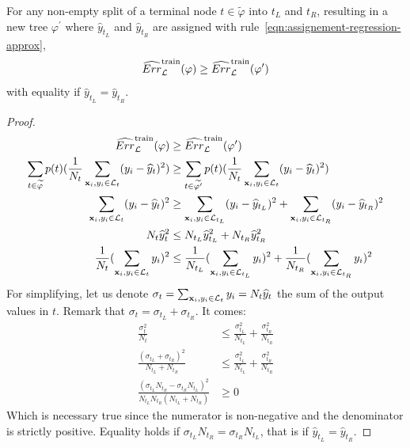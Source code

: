 \begin{proposition}\label{prop:any-split-reduce-regression}
For any non-empty split of a terminal node $t \in \widetilde{\varphi}$ into $t_L$ and
$t_R$, resulting in a new tree $\varphi^\prime$ where $\widehat{y}_{t_L}$ and $\widehat{y}_{t_R}$
are assigned with rule~\ref{eqn:assignement-regression-approx}, $$\widehat{Err}_{\cal
L}^\text{train}(\varphi) \geq \widehat{Err}_{\cal
L}^\text{train}(\varphi^\prime)$$ with equality if $\widehat{y}_{t_L} = \widehat{y}_{t_R}$.
\end{proposition}

\begin{proof}
\begin{align*}
\widehat{Err}_{\cal L}^\text{train}(\varphi) &\geq \widehat{Err}_{\cal L}^\text{train}(\varphi^\prime)  \\
\sum_{t \in \widetilde{\varphi}} p(t) (\frac{1}{N_t} \sum_{\mathbf{x}_i, y_i \in {\cal L}_t} (y_i - \widehat{y}_t)^2) &\geq \sum_{t \in \widetilde{\varphi^\prime}} p(t) (\frac{1}{N_t} \sum_{\mathbf{x}_i, y_i \in {\cal L}_t} (y_i - \widehat{y}_t)^2) \\
\sum_{\mathbf{x}_i, y_i \in {\cal L}_t} (y_i - \widehat{y}_t)^2 &\geq \sum_{\mathbf{x}_i, y_i \in {\cal L}_{t_L}} (y_i - \widehat{y}_{t_L})^2 + \sum_{\mathbf{x}_i, y_i \in {\cal L}_{t_R}} (y_i - \widehat{y}_{t_R})^2 \\
N_t \widehat{y}_t^2 &\leq N_{t_L} \widehat{y}_{t_L}^2 + N_{t_R} \widehat{y}_{t_R}^2 \\
\frac{1}{N_t} (\sum_{\mathbf{x}_i, y_i \in {\cal L}_{t}} y_i)^2 &\leq \frac{1}{N_{t_L}} (\sum_{\mathbf{x}_i, y_i \in {\cal L}_{t_L}} y_i)^2 + \frac{1}{N_{t_R}} (\sum_{\mathbf{x}_i, y_i \in {\cal L}_{t_R}} y_i)^2
\end{align*}
For simplifying, let us denote $\sigma_t = \sum_{\mathbf{x}_i, y_i \in {\cal L}_{t}} y_i = N_t \widehat{y}_t$
the sum of the output values in $t$. Remark that $\sigma_t = \sigma_{t_L} + \sigma_{t_R}$. It comes:
\begin{align*}
\frac{\sigma_t^2}{N_t} &\leq \frac{\sigma_{t_L}^2}{N_{t_L}} + \frac{\sigma_{t_R}^2}{N_{t_R}} \\
\frac{(\sigma_{t_L} + \sigma_{t_R})^2}{N_{t_L} + N_{t_R}} &\leq \frac{\sigma_{t_L}^2}{N_{t_L}} + \frac{\sigma_{t_R}^2}{N_{t_R}} \\
\frac{(\sigma_{t_L} N_{t_R} - \sigma_{t_R} N_{t_L})^2}{N_{t_L} N_{t_R} (N_{t_L} + N_{t_R})} &\geq 0
\end{align*}
Which is necessary true since the numerator is non-negative and the denominator is
strictly positive. Equality holds if $\sigma_{t_L} N_{t_R} = \sigma_{t_R} N_{t_L}$, that is if $\widehat{y}_{t_L} = \widehat{y}_{t_R}$.
\end{proof}

